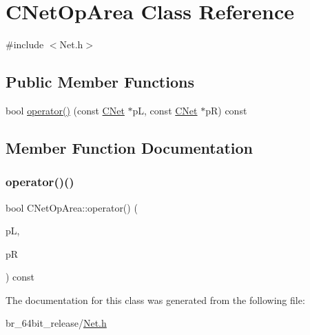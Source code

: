 \hypertarget{classCNetOpArea}{}\section{C\+Net\+Op\+Area Class Reference}
\label{classCNetOpArea}


{\ttfamily \#include $<$Net.\+h$>$}

\subsection*{Public Member Functions}
\begin{DoxyCompactItemize}
\item 
bool \mbox{\hyperlink{classCNetOpArea_aab7fba441452c921c5da375d61d7bfed}{operator()}} (const \mbox{\hyperlink{classCNet}{C\+Net}} $\ast$pL, const \mbox{\hyperlink{classCNet}{C\+Net}} $\ast$pR) const
\end{DoxyCompactItemize}


\subsection{Member Function Documentation}
\mbox{\label{classCNetOpArea_aab7fba441452c921c5da375d61d7bfed}} 
\subsubsection{\texorpdfstring{operator()()}{operator()()}}
{\footnotesize\ttfamily bool C\+Net\+Op\+Area\+::operator() (\begin{DoxyParamCaption}\item[{const \mbox{\hyperlink{classCNet}{C\+Net}} $\ast$}]{pL,  }\item[{const \mbox{\hyperlink{classCNet}{C\+Net}} $\ast$}]{pR }\end{DoxyParamCaption}) const\hspace{0.3cm}{\ttfamily [inline]}}



The documentation for this class was generated from the following file\+:\begin{DoxyCompactItemize}
\item 
br\+\_\+64bit\+\_\+release/\mbox{\hyperlink{Net_8h}{Net.\+h}}\end{DoxyCompactItemize}

